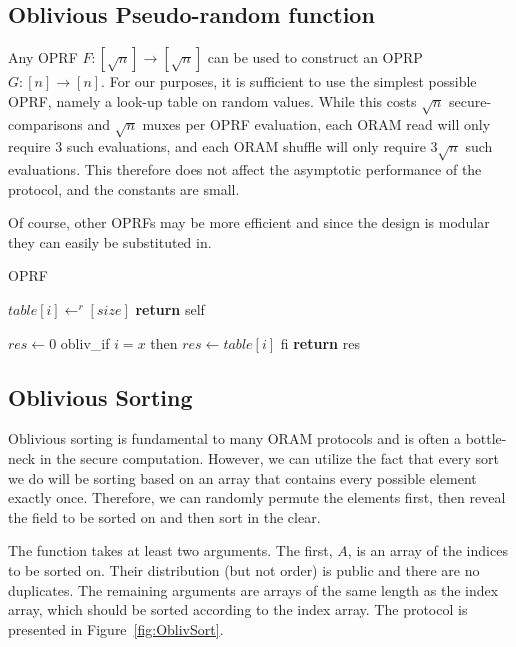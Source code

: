 \subsection{Oblivious Pseudo-random function}

Any OPRF $F : [\sqrt{n}] \rightarrow [\sqrt{n}]$ can be used to 
construct an OPRP $G : [n] \rightarrow [n]$.
For our purposes, it is sufficient to use the simplest possible
OPRF, namely a look-up table on random values.
While this costs $\sqrt{n}$ secure-comparisons and 
$\sqrt{n}$ muxes per OPRF evaluation,
each ORAM read will only require $3$ such evaluations,
and each ORAM shuffle will only require $3 \sqrt{n}$ such evaluations.
This therefore does not affect the asymptotic performance
of the protocol, and the constants are small.

Of course, other OPRFs may be more efficient and since the design
is modular they can easily be substituted in.

\begin{algorithm}
\caption{OPRF}
\label{alg:oprf}
\begin{algorithmic}[1]

 
    \State $table[i] \gets^r [size]$
\EndFor
\State \textbf{return} self
\EndProcedure

\State

\State $res \gets 0$
    \State obliv\_if $i = x$ then
    \State $res \gets table[i]$
    \State fi
\EndFor
\State \textbf{return} res
\EndProcedure

\end{algorithmic}
\end{algorithm}

\subsection{Oblivious Sorting}

Oblivious sorting is fundamental to many ORAM protocols and is often
a bottle-neck in the secure computation.
However, we can utilize the fact that every sort we do will be sorting
based on an array that contains every possible element exactly once.
Therefore, we can randomly permute the elements first,
then reveal the field to be sorted on and then sort in the clear.

The function takes at least two arguments. 
The first, $A$, is an array of the indices to be sorted on.
Their distribution (but not order) is public and there are no duplicates.
The remaining arguments are arrays of the same length as the index array,
which should be sorted according to the index array.
The protocol is presented in Figure~\ref{fig:OblivSort}.


